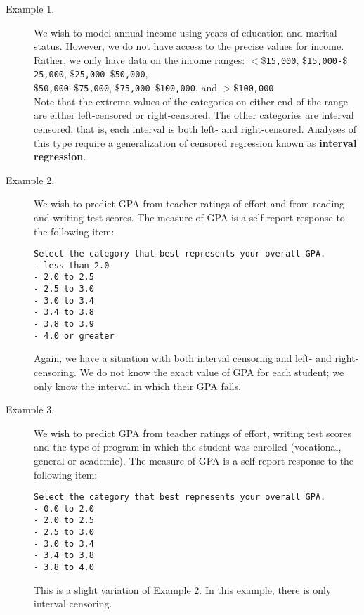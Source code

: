 \documentclass[a4paper,12pt]{article}
\begin{document}
\begin{description}
\item[Example 1.]  We wish to model annual income using years of education and marital status.  However, we do not have access to the precise values for income.  
Rather, we only have data on the income ranges: \texttt{$<\$$15,000}, \texttt{$\$$15,000-$\$$25,000}, \texttt{$\$$25,000-$\$$50,000}, \\ \texttt{$\$$50,000-$\$$75,000}, \texttt{$\$$75,000-$\$$100,000}, and \texttt{$ > \$ $100,000}.  \\ Note that the extreme values of the categories on either end of the range are either left-censored or right-censored.  The other categories are interval censored, that is, each interval is both left- and right-censored.  Analyses of this type require a generalization of censored regression known as \textbf{interval regression}.
\newpage
\item[Example 2.]  We wish to predict GPA from teacher ratings of effort and from reading and writing test scores.  The measure of GPA is a self-report response to the following item:
{
\large
\begin{framed}
	\begin{verbatim}
Select the category that best represents your overall GPA.
- less than 2.0
- 2.0 to 2.5
- 2.5 to 3.0
- 3.0 to 3.4
- 3.4 to 3.8
- 3.8 to 3.9
- 4.0 or greater
\end{verbatim}
\end{framed}
}
Again, we have a situation with both interval censoring and left- and right-censoring. We do not know the exact value of GPA for each student; we only know the interval in which their GPA falls.

\item[Example 3.] We wish to predict GPA from teacher ratings of effort, writing test scores and the type of program in which the student was enrolled (vocational, general or academic). The measure of GPA is a self-report response to the following item:
{
	\large 
\begin{framed}
\begin{verbatim}
Select the category that best represents your overall GPA.
- 0.0 to 2.0
- 2.0 to 2.5
- 2.5 to 3.0
- 3.0 to 3.4
- 3.4 to 3.8
- 3.8 to 4.0
\end{verbatim}
\end{framed}
}
This is a slight variation of Example 2. In this example, there is only interval censoring.
\end{description}
\end{document}
